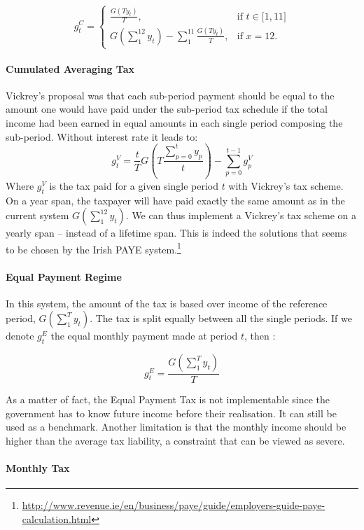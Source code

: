\[
g_{t}^{C}=%
\begin{cases}
\frac{G(Ty_{t})}{T}, & \mbox{if }t\in\lbrack1,11]\\
G(\sum_{1}^{12}y_{t})-\sum_{1}^{11}\frac{G(Ty_{t})}{T}, & \mbox{if }x=12.
\end{cases}
\]


\paragraph{Cumulated Averaging Tax}

Vickrey's proposal was that each sub-period payment should be equal to the
amount one would have paid under the sub-period tax schedule if the total
income had been earned in equal amounts in each single period composing the
sub-period. Without interest rate it leads to:
\begin{equation}
{g_{t}^{V}}=\frac{t}{T}G\left(  T\frac{\sum_{p=0}^{t}y_{p}}{t}\right)
-\sum_{p=0}^{t-1}{g_{p}^{V}}\label{eq:vickrey}%
\end{equation}
Where $g_{t}^{V}$ is the tax paid for a given single period $t$ with Vickrey's
tax scheme. On a year span, the taxpayer will have paid exactly the same
amount as in the current system $G(\sum_{1}^{12}y_{t})$. We can thus implement
a Vickrey's tax scheme on a yearly span -- instead of a lifetime span. This is
indeed the solutions that seems to be chosen by the Irish PAYE
system.\footnote{\url{http://www.revenue.ie/en/business/paye/guide/employers-guide-paye-calculation.html}}%


\paragraph{Equal Payment Regime}

In this system, the amount of the tax is based over income of the reference
period, $G(\sum_{1}^{T}y_{t})$. The tax is split equally between all the
single periods. If we denote $g_{t}^{E}$ the equal monthly payment made at
period $t$, then :%

\[
g_{t}^{E}=\frac{G(\sum_{1}^{T}y_{t})}{T}
\]


As a matter of fact, the Equal Payment Tax is not implementable since the
government has to know future income before their realisation. It can still be
used as a benchmark. Another limitation is that the monthly income should be
higher than the average tax liability, a constraint that can be viewed as severe.

\paragraph{Monthly Tax}

